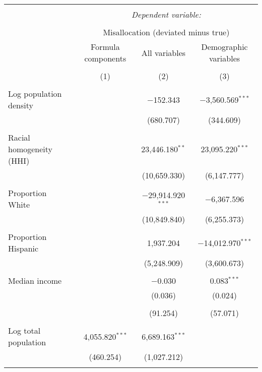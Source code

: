 
\begin{table}[!htbp] \centering 
  \caption{} 
  \label{} 
\begin{tabular}{@{\extracolsep{5pt}}lccc} 
\\[-1.8ex]\hline 
\hline \\[-1.8ex] 
 & \multicolumn{3}{c}{\textit{Dependent variable:}} \\ 
\cline{2-4} 
\\[-1.8ex] & \multicolumn{3}{c}{Misallocation (deviated minus true)} \\ 
 & Formula components & All variables & Demographic variables \\ 
\\[-1.8ex] & (1) & (2) & (3)\\ 
\hline \\[-1.8ex] 
 Log population density &  & $-$152.343 & $-$3,560.569$^{***}$ \\ 
  &  & (680.707) & (344.609) \\ 
  & & & \\ 
 Racial homogeneity (HHI) &  & 23,446.180$^{**}$ & 23,095.220$^{***}$ \\ 
  &  & (10,659.330) & (6,147.777) \\ 
  & & & \\ 
 Proportion White &  & $-$29,914.920$^{***}$ & $-$6,367.596 \\ 
  &  & (10,849.840) & (6,255.373) \\ 
  & & & \\ 
 Proportion Hispanic &  & 1,937.204 & $-$14,012.970$^{***}$ \\ 
  &  & (5,248.909) & (3,600.673) \\ 
  & & & \\ 
 Median income &  & $-$0.030 & 0.083$^{***}$ \\ 
  &  & (0.036) & (0.024) \\ 
  & & & \\ 
  &  & (91.254) & (57.071) \\ 
  & & & \\ 
 Log total population & 4,055.820$^{***}$ & 6,689.163$^{***}$ &  \\ 
  & (460.254) & (1,027.212) &  \\ 
  & & & \\ 

\end{tabular}
\end{table}
